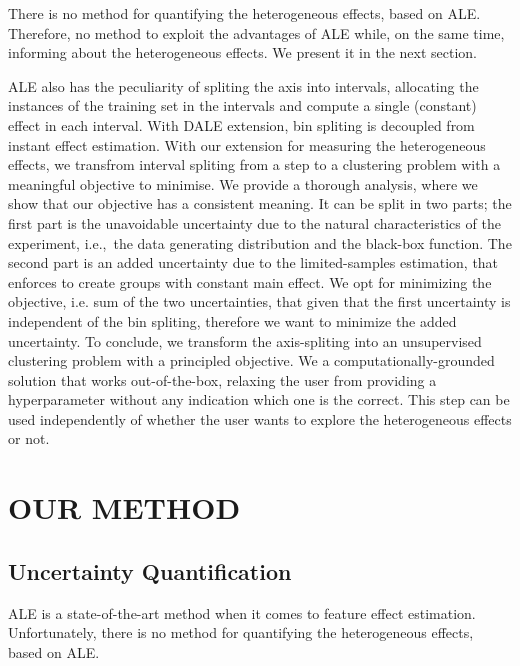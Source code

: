 \documentclass[twoside]{article}
\begin{document}
There is no method for quantifying the heterogeneous effects, based on
ALE. Therefore, no method to exploit the advantages of ALE while, on
the same time, informing about the heterogeneous effects. We present
it in the next section.

ALE also has the peculiarity of spliting the axis into intervals,
allocating the instances of the training set in the intervals and
compute a single (constant) effect in each interval. With DALE
extension, bin spliting is decoupled from instant effect
estimation. With our extension for measuring the heterogeneous
effects, we transfrom interval spliting from a step to a clustering
problem with a meaningful objective to minimise. We provide a thorough
analysis, where we show that our objective has a consistent
meaning. It can be split in two parts; the first part is the
unavoidable uncertainty due to the natural characteristics of the
experiment, i.e.,~the data generating distribution and the black-box
function. The second part is an added uncertainty due to the
limited-samples estimation, that enforces to create groups with
constant main effect. We opt for minimizing the objective, i.e. sum of
the two uncertainties, that given that the first uncertainty is
independent of the bin spliting, therefore we want to minimize the
added uncertainty. To conclude, we transform the axis-spliting into an
unsupervised clustering problem with a principled objective. We a
computationally-grounded solution that works out-of-the-box, relaxing
the user from providing a hyperparameter without any indication which
one is the correct. This step can be used independently of whether the
user wants to explore the heterogeneous effects or not.

\section{OUR METHOD}

\subsection{Uncertainty Quantification}

ALE is a state-of-the-art method when it comes to feature effect
estimation. Unfortunately, there is no method for quantifying the
heterogeneous effects, based on ALE.


\end{document}
